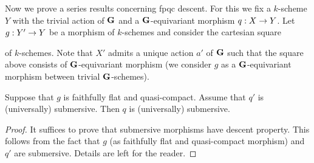 \noindent
Now we prove a series results concerning fpqc descent. For this we fix a $k$-scheme $Y$ with the trivial action of $\mathbf{G}$ and a $\mathbf{G}$-equivariant morphism $q:X\rightarrow Y$. Let $g:Y'\rightarrow Y$ be a morphism of $k$-schemes and consider the cartesian square
\begin{center}
\end{center}
of $k$-schemes. Note that $X'$ admits a unique action $a'$ of $\mathbf{G}$ such that the square above consists of $\mathbf{G}$-equivariant morphism (we consider $g$ as a $\mathbf{G}$-equivariant morphism between trivial $\mathbf{G}$-schemes).

\begin{fact}\label{fact:submersive_and_universally_submersive_descent_along_fpgc}
Suppose that $g$ is faithfully flat and quasi-compact. Assume that $q'$ is (universally) submersive. Then $q$ is (universally) submersive.
\end{fact}
\begin{proof}
It suffices to prove that submersive morphisms have descent property. This follows from the fact that $g$ (as faithfully flat and quasi-compact morphism) and $q'$ are submersive. Details are left for the reader.
\end{proof}

